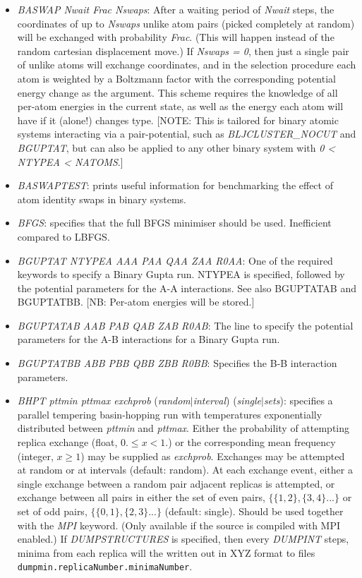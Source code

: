 \documentclass[12pt,a4paper,dvips]{article}
\begin{document}
\begin{itemize}
\item {\it BASWAP Nwait Frac Nswaps\/}: After a waiting period of {\it Nwait\/} steps, the coordinates of up to {\it Nswaps\/} unlike atom pairs (picked completely at random) will be exchanged with probability {\it Frac\/}. (This will happen instead of the random cartesian displacement move.) If {\it Nswaps = 0\/}, then just a single pair of unlike atoms will exchange coordinates, and in the selection procedure each atom is weighted by a Boltzmann factor with the corresponding potential energy change as the argument. This scheme requires the knowledge of all per-atom energies in the current state, as well as the energy each atom will have if it (alone!) changes type. [NOTE: This is tailored for binary atomic systems interacting via a pair-potential, such as {\it BLJCLUSTER\_NOCUT\/} and {\it BGUPTAT\/}, but can also be applied to any other binary system with {\it 0 < NTYPEA < NATOMS\/}.]

\item {\it BASWAPTEST}: prints useful information for benchmarking the effect of atom identity swaps in binary systems.

\item {\it BFGS}: specifies that the full BFGS minimiser should be used. Inefficient compared to LBFGS.

\item {\it BGUPTAT NTYPEA AAA PAA QAA ZAA R0AA}: One of the required keywords to specify a Binary Gupta run. 
NTYPEA is specified, followed by the potential parameters for the A-A interactions. See also BGUPTATAB and BGUPTATBB.
[NB: Per-atom energies will be stored.]

\item {\it BGUPTATAB AAB PAB QAB ZAB R0AB}: The line to specify the potential parameters for the A-B interactions 
for a Binary Gupta run.

\item {\it BGUPTATBB ABB PBB QBB ZBB R0BB}: Specifies the B-B interaction parameters.

\item {{\it BHPT pttmin pttmax exchprob\/} ({\it random\/}$|${\it interval\/}) ({\it single\/}$|${\it sets\/})\/}:
specifies a parallel tempering basin-hopping run with temperatures exponentially distributed between {\it pttmin\/} and
{\it pttmax\/}. Either the probability of attempting replica exchange (float, $0. \le x < 1.$) or the corresponding mean frequency
(integer, $x \ge 1$) may be supplied as {\it exchprob\/}. Exchanges may be attempted at random or at intervals (default: random).
At each exchange event, either a single exchange between a random pair adjacent replicas is attempted, or exchange between all
pairs in either the set of even pairs, $\{\{1,2\},\{3,4\}...\}$ or set of odd pairs, $\{\{0,1\},\{2,3\}...\}$ (default: single).
Should be used together with the {\it MPI\/} keyword.
(Only available if the source is compiled with MPI enabled.) If {\it DUMPSTRUCTURES\/} is specified, then every {\it DUMPINT\/} steps, minima from each replica will the written out in XYZ format to files {\tt dumpmin.replicaNumber.minimaNumber}.


\end{itemize}
\end{document}
